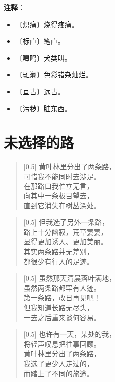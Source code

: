 \documentclass[12pt,UTF-8,openany]{ctexbook}
\begin{document}
\newpage

\textbf{注释}：

\vspace{-1em}

\begin{itemize}
    \setlength\itemsep{-0.2em}
    \item 〔炽痛〕烧得疼痛。
    \item 〔标直〕笔直。
    \item 〔嗥鸣〕犬类叫。
    \item 〔斑斓〕色彩错杂灿烂。
    \item 〔亘古〕远古。
    \item 〔污秽〕脏东西。
\end{itemize}

\chapter{未选择的路}

\begin{large}
    
    \begin{verse}[0.5\linewidth]
        黄叶林里分出了两条路， \\
        可惜我不能同时去涉足。 \\
        在那路口我伫立无言， \\
        向其中一条极目望去， \\
        直到它消失在树丛深处。
    \end{verse}
    
    
    \begin{verse}[0.5\linewidth]
        但我选了另外一条路， \\
        路上十分幽寂，荒草萋萋， \\
        显得更加诱人、更加美丽。 \\
        其实两条路并无差别， \\
        都很少有行人的足迹。
    \end{verse}
    
    
    \begin{verse}[0.5\linewidth]
        虽然那天清晨落叶满地， \\
        虽然两条路都罕有人迹。 \\
        第一条路，改日再见吧！ \\
        但我知道长路无尽头， \\
        一去之后重来谈何容易。
    \end{verse}
    
    
    \begin{verse}[0.5\linewidth]
        也许有一天，某处的我， \\
        将轻声叹息把往事回顾。 \\
        黄叶林里分出了两条路， \\
        我选了更少人走过的， \\
        而踏上了不同的旅途。
    \end{verse}
    
\end{large}
\end{document}
